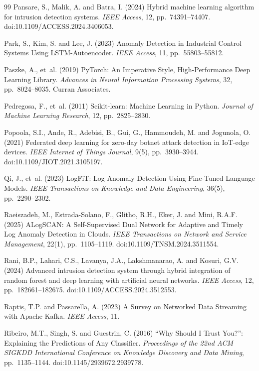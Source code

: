 \documentclass[12pt,a4paper]{report}
\begin{document}
\begin{thebibliography}{99}
Pansare, S., Malik, A. and Batra, I. (2024) Hybrid machine learning algorithm for intrusion detection systems. \textit{IEEE Access}, 12, pp.~74391--74407. doi:10.1109/ACCESS.2024.3406053.

Park, S., Kim, S. and Lee, J. (2023) Anomaly Detection in Industrial Control Systems Using LSTM-Autoencoder. \textit{IEEE Access}, 11, pp.~55803--55812.

Paszke, A., et~al. (2019) PyTorch: An Imperative Style, High-Performance Deep Learning Library. \textit{Advances in Neural Information Processing Systems}, 32, pp.~8024--8035. Curran Associates.

Pedregosa, F., et~al. (2011) Scikit-learn: Machine Learning in Python. \textit{Journal of Machine Learning Research}, 12, pp.~2825--2830.

Popoola, S.I., Ande, R., Adebisi, B., Gui, G., Hammoudeh, M. and Jogunola, O. (2021) Federated deep learning for zero-day botnet attack detection in IoT-edge devices. \textit{IEEE Internet of Things Journal}, 9(5), pp.~3930--3944. doi:10.1109/JIOT.2021.3105197.

Qi, J., et~al. (2023) LogFiT: Log Anomaly Detection Using Fine-Tuned Language Models. \textit{IEEE Transactions on Knowledge and Data Engineering}, 36(5), pp.~2290--2302.

Raeiszadeh, M., Estrada-Solano, F., Glitho, R.H., Eker, J. and Mini, R.A.F. (2025) ALogSCAN: A Self-Supervised Dual Network for Adaptive and Timely Log Anomaly Detection in Clouds. \textit{IEEE Transactions on Network and Service Management}, 22(1), pp.~1105--1119. doi:10.1109/TNSM.2024.3511554.

Rani, B.P., Lahari, C.S., Lavanya, J.A., Lakshmanarao, A. and Kosuri, G.V. (2024) Advanced intrusion detection system through hybrid integration of random forest and deep learning with artificial neural networks. \textit{IEEE Access}, 12, pp.~182661--182675. doi:10.1109/ACCESS.2024.3512553.

Raptis, T.P. and Passarella, A. (2023) A Survey on Networked Data Streaming with Apache Kafka. \textit{IEEE Access}, 11.

Ribeiro, M.T., Singh, S. and Guestrin, C. (2016) ``Why Should I Trust You?'': Explaining the Predictions of Any Classifier. \textit{Proceedings of the 22nd ACM SIGKDD International Conference on Knowledge Discovery and Data Mining}, pp.~1135--1144. doi:10.1145/2939672.2939778.


\end{thebibliography}
\end{document}
